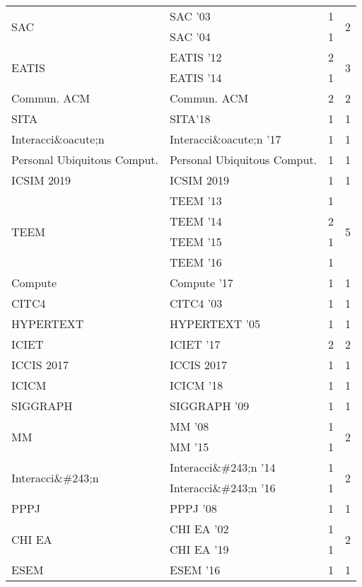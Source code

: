 \begin{table*}[t]
\begin{tabular}{llrr}
\multirow{2}{*}{SAC } & SAC '03 & 1 & \multirow{2}{*}{2}\\
& SAC '04 & 1 &\\
\multirow{2}{*}{EATIS } & EATIS '12 & 2 & \multirow{2}{*}{3}\\
& EATIS '14 & 1 &\\
\multirow{1}{*}{Commun. ACM} & Commun. ACM & 2 & \multirow{1}{*}{2}\\
\multirow{1}{*}{SITA} & SITA'18 & 1 & \multirow{1}{*}{1}\\
\multirow{1}{*}{Interacci\&oacute;n } & Interacci\&oacute;n '17 & 1 & \multirow{1}{*}{1}\\
\multirow{1}{*}{Personal Ubiquitous Comput.} & Personal Ubiquitous Comput. & 1 & \multirow{1}{*}{1}\\
\multirow{1}{*}{ICSIM 2019} & ICSIM 2019 & 1 & \multirow{1}{*}{1}\\
\multirow{4}{*}{TEEM } & TEEM '13 & 1 & \multirow{4}{*}{5}\\
& TEEM '14 & 2 &\\
& TEEM '15 & 1 &\\
& TEEM '16 & 1 &\\
\multirow{1}{*}{Compute } & Compute '17 & 1 & \multirow{1}{*}{1}\\
\multirow{1}{*}{CITC4 } & CITC4 '03 & 1 & \multirow{1}{*}{1}\\
\multirow{1}{*}{HYPERTEXT } & HYPERTEXT '05 & 1 & \multirow{1}{*}{1}\\
\multirow{1}{*}{ICIET } & ICIET '17 & 2 & \multirow{1}{*}{2}\\
\multirow{1}{*}{ICCIS 2017} & ICCIS 2017 & 1 & \multirow{1}{*}{1}\\
\multirow{1}{*}{ICICM } & ICICM '18 & 1 & \multirow{1}{*}{1}\\
\multirow{1}{*}{SIGGRAPH } & SIGGRAPH '09 & 1 & \multirow{1}{*}{1}\\
\multirow{2}{*}{MM } & MM '08 & 1 & \multirow{2}{*}{2}\\
& MM '15 & 1 &\\
\multirow{2}{*}{Interacci\&\#243;n } & Interacci\&\#243;n '14 & 1 & \multirow{2}{*}{2}\\
& Interacci\&\#243;n '16 & 1 &\\
\multirow{1}{*}{PPPJ } & PPPJ '08 & 1 & \multirow{1}{*}{1}\\
\multirow{2}{*}{CHI EA } & CHI EA '02 & 1 & \multirow{2}{*}{2}\\
& CHI EA '19 & 1 &\\
\multirow{1}{*}{ESEM } & ESEM '16 & 1 & \multirow{1}{*}{1}\\

\end{tabular}
\end{table*}
